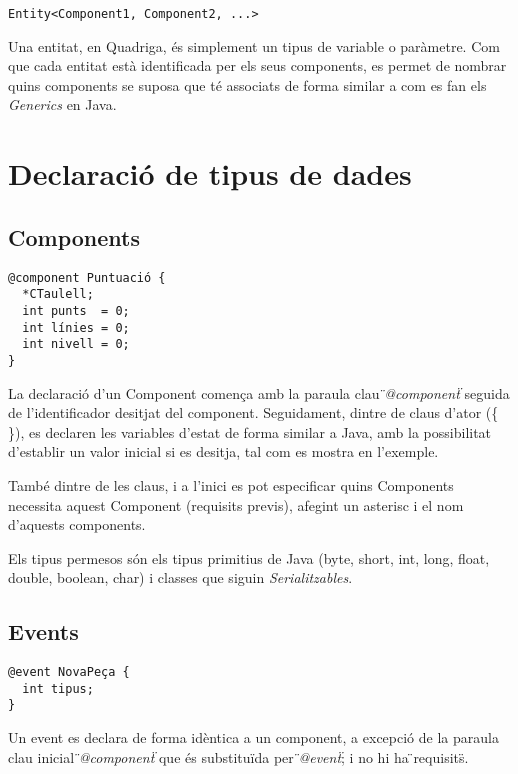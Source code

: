 \begin{verbatim}
Entity<Component1, Component2, ...>
\end{verbatim}

Una entitat, en Quadriga, és simplement un tipus de variable o paràmetre. Com que cada entitat està identificada per els seus components, es permet de nombrar quins components se suposa que té associats de forma similar a com es fan els {\em Generics} en Java.

\section{Declaració de tipus de dades}

\subsection{Components}

\begin{verbatim}
@component Puntuació {
  *CTaulell;
  int punts  = 0;
  int línies = 0;
  int nivell = 0;
}
\end{verbatim}

La declaració d'un Component comença amb la paraula clau {\em \"{}@component\"{}} seguida de l'identificador desitjat del component. Seguidament, dintre de claus d'ator (\{ \}), es declaren les variables d'estat de forma similar a Java, amb la possibilitat d'establir un valor inicial si es desitja, tal com es mostra en l'exemple.

També dintre de les claus, i a l'inici es pot especificar quins Components necessita aquest Component (requisits previs), afegint un asterisc {\bf *} i el nom d'aquests components.

Els tipus permesos són els tipus primitius de Java (byte, short, int, long, float, double, boolean, char) i classes que siguin {\em Serialitzables}.

\subsection{Events}

\begin{verbatim}
@event NovaPeça {
  int tipus;
}
\end{verbatim}

Un event es declara de forma idèntica a un component, a excepció de la paraula clau inicial {\em \"{}@component\"{}} que és substituïda per {\em \"{}@event\"{}}; i no hi ha \"{}requisits\"{}.

